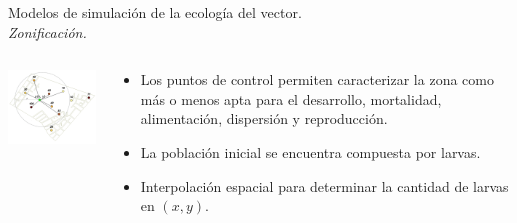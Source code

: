 \begin{frame}[c]{Modelos de simulación de la ecología del vector.\\\textit{Zonificación.}}
  \begin{center}
   \begin{columns}[T]
        \begin{column}[T]{5cm}
            \includegraphics[width=5.5cm]{./graphics/zonificacion.png}
        \end{column}
        \begin{column}[T]{6cm}
          \begin{itemize}
          \item Los puntos de control permiten caracterizar la zona como más o menos apta para el desarrollo, mortalidad, alimentación, dispersión y reproducción.
          \item La población inicial se encuentra compuesta por larvas.
          \item Interpolación espacial para determinar la cantidad de larvas en $(x, y)$.
          \end{itemize}
        \end{column}
    \end{columns}
  \end{center}
\end{frame}


